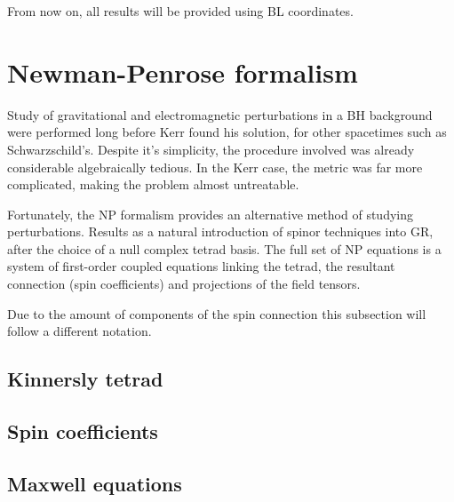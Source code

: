 From now on, all results will be provided using BL coordinates.

\section{Newman-Penrose formalism}

Study of gravitational and electromagnetic perturbations in a BH background were performed long before Kerr found his solution, for other spacetimes such as Schwarzschild's. Despite it's simplicity, the procedure involved was already considerable algebraically tedious. In the Kerr case, the metric was far more complicated, making the problem almost untreatable.

Fortunately, the NP formalism provides an alternative method of studying perturbations.
Results as a natural introduction of spinor techniques into GR, after the choice of a null complex tetrad basis. 
The full set of NP equations is a system of first-order coupled equations linking the tetrad, the resultant connection (spin coefficients) and projections of the field tensors.  

Due to the amount of components of the spin connection this subsection will follow a different notation.

\subsection{Kinnersly tetrad}


\subsection{Spin coefficients}
\subsection{Maxwell equations}


\cleardoublepage
